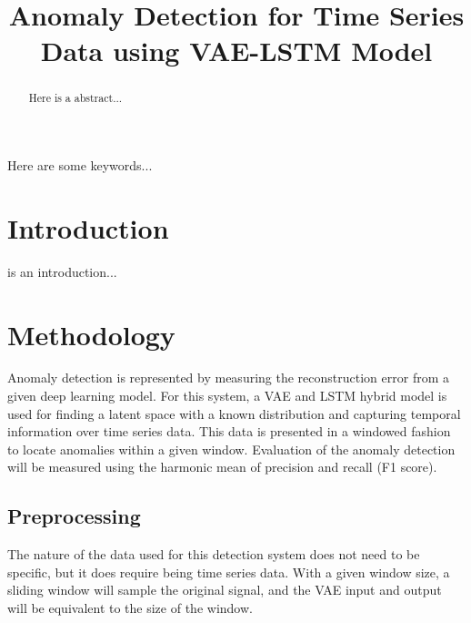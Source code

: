 \documentclass[conference]{IEEEtran}
\begin{document}
\title{Anomaly Detection for Time Series Data using VAE-LSTM Model}

\author{
    \and
    \and
}

\maketitle

\begin{abstract}
Here is a abstract...
\end{abstract}

\begin{IEEEkeywords}
Here are some keywords...
\end{IEEEkeywords}

\section{Introduction}
 is an introduction...

\section{Methodology}
Anomaly detection is represented by measuring the reconstruction error from a given deep learning model. For this system, a VAE and LSTM hybrid model is used for finding a latent space with a known distribution and capturing temporal information over time series data. This data is presented in a windowed fashion to locate anomalies within a given window. Evaluation of the anomaly detection will be measured using the harmonic mean of precision and recall (F1 score).

\subsection{Preprocessing}
The nature of the data used for this detection system does not need to be specific, but it does require being time series data. With a given window size, a sliding window will sample the original signal, and the VAE input and output will be equivalent to the size of the window. 
\end{document}
